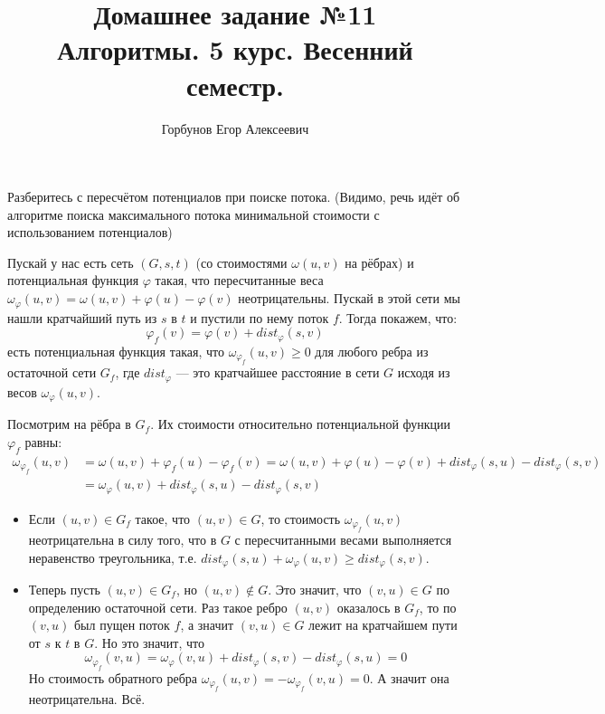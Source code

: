 

\title{Домашнее задание №11 \\ Алгоритмы. 5 курс. Весенний семестр.}
\author{Горбунов Егор Алексеевич}


\maketitle
\begin{task}[1]
Разберитесь с пересчётом потенциалов при поиске потока. (Видимо, речь идёт об алгоритме поиска максимального потока минимальной стоимости с использованием потенциалов)
\end{task}
\begin{solution}
Пускай у нас есть сеть $(G, s, t)$ (со стоимостями $\omega(u, v)$ на рёбрах) и потенциальная функция $\varphi$ такая, что пересчитанные веса $\omega_{\varphi}(u,v) = \omega(u,v)+\varphi(u)-\varphi(v)$ неотрицательны. Пускай в этой сети мы нашли кратчайший путь из $s$ в $t$ и пустили по нему поток $f$. Тогда покажем, что:
\[
	\varphi_f(v) = \varphi(v) + dist_{\varphi}(s, v)
\]
есть потенциальная функция такая, что $\omega_{\varphi_f}(u, v) \geq 0$ для любого ребра из остаточной сети $G_f$, где $dist_{\varphi}$ --- это кратчайшее расстояние в сети $G$ исходя из весов $\omega_{\varphi}(u, v)$.

Посмотрим на рёбра в $G_f$. Их стоимости относительно потенциальной функции $\varphi_f$ равны:
\begin{align*}
	\omega_{\varphi_f}(u, v) &= \omega(u, v) + \varphi_f(u) - \varphi_f(v) = \omega(u,v)+\varphi(u)-\varphi(v) 
	+ dist_{\varphi}(s, u) - dist_{\varphi}(s, v) \\
	&= \omega_{\varphi}(u, v) + dist_{\varphi}(s, u) - dist_{\varphi}(s, v)
\end{align*}
\begin{itemize}
	\item Если $(u, v) \in G_f$ такое, что $(u, v) \in G$, то стоимость $\omega_{\varphi_f}(u, v)$ неотрицательна в силу того, что в $G$ с пересчитанными весами выполняется неравенство треугольника, т.е. $dist_{\varphi}(s, u) + \omega_{\varphi}(u, v) \geq dist_{\varphi}(s, v)$.
	\item Теперь пусть $(u, v) \in G_f$, но $(u, v) \notin G$. Это значит, что $(v, u) \in G$ по определению остаточной сети. Раз такое ребро $(u, v)$ оказалось в $G_f$, то по $(v, u)$ был пущен поток $f$, а значит $(v, u) \in G$ лежит на кратчайшем пути от $s$ к $t$ в $G$. Но это значит, что 
	\[
		\omega_{\varphi_f}(v, u) = \omega_{\varphi}(v, u) + dist_{\varphi}(s, v) - dist_{\varphi}(s, u) = 0
	\]
	Но стоимость обратного ребра $\omega_{\varphi_f}(u, v) = -\omega_{\varphi_f}(v, u) = 0$. А значит она неотрицательна. Всё. \xqed
\end{itemize}
\end{solution}

